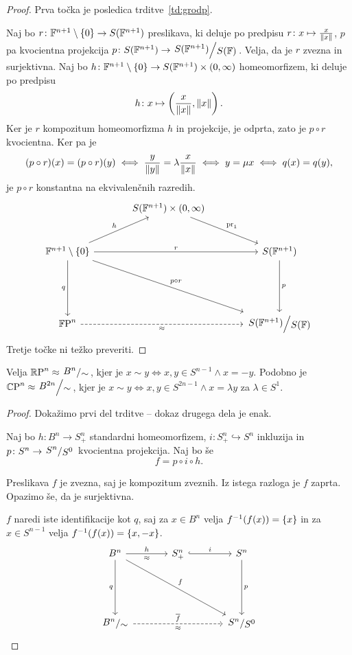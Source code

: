 
\begin{proof}
Prva točka je posledica trditve~\ref{td:grodp}.

Naj bo $r \colon \mathbb{F}^{n+1} \setminus \left\{0\right\} \to S(\mathbb{F}^{n+1})$
preslikava, ki deluje po predpisu
$r \colon x \mapsto \frac{x}{\left\lVert x\right\rVert}$, $p$ pa kvocientna
projekcija $p \colon S(\F^{n+1}) \to \kvoc{S(\F^{n+1})}{S(\F)}$.
Velja, da je $r$ zvezna in surjektivna. Naj bo
$h \colon \mathbb{F}^{n+1} \setminus \left\{0\right\} \to
S(\mathbb{F}^{n+1}) \times (0, \infty)$
homeomorfizem, ki deluje po predpisu
\[
h \colon x \mapsto \left(\frac{x}{\left\lVert x\right\rVert}, \left\lVert x\right\rVert\right).
\]
Ker je $r$ kompozitum homeomorfizma $h$ in projekcije,
je odprta, zato je $p \circ r$ kvocientna. Ker pa je
\[
(p \circ r)(x) = (p \circ r)(y) \iff
\frac{y}{\left\lVert y\right\rVert} = \lambda \frac{x}{\left\lVert x\right\rVert} \iff
y = \mu x \iff
q(x) = q(y),
\]
je $p \circ r$ konstantna na ekvivalenčnih razredih.
\[
\begin{tikzcd}[column sep=large, row sep=large]
& S(\F^{n+1}) \times (0, \infty)
  \arrow[dr, "\operatorname{pr}_1"]
&\\
\F^{n+1} \setminus \set{0}
\arrow[ur, "h"]
\arrow[rr, "r"]
\arrow[dd, "q"']
\arrow[ddrr, "p \circ r"]
&& S(\F^{n+1})
\arrow[dd, "p"] \\\\
\proj{\F}{n} \arrow[rr, dashrightarrow, "\approx"']
&& \kvoc{S(\F^{n+1})}{S(\F)}
\end{tikzcd}
\]
Tretje točke ni težko preveriti.
\end{proof}

\begin{trditev}
Velja $\proj{\R}{n} \approx \kvoc{B^n}{\sim}$, kjer je
$x \sim y \iff x, y \in S^{n-1} \land x = -y$. Podobno je
$\proj{\C}{n} \approx \kvoc{B^{2n}}{\sim}$, kjer je
$x \sim y \iff x, y \in S^{2n-1} \land x = \lambda y$ za
$\lambda \in S^1$.
\end{trditev}

\begin{proof}
Dokažimo prvi del trditve -- dokaz drugega dela je enak.

Naj bo $h \colon B^n \to S_+^n$ standardni homeomorfizem,
$i \colon S_+^n \hookrightarrow S^n$ inkluzija in
$p \colon S^n \to \kvoc{S^n}{S^0}$ kvocientna projekcija. Naj bo še
\[
f = p \circ i \circ h.
\]

Preslikava $f$ je zvezna, saj je kompozitum zveznih. Iz istega
razloga je $f$ zaprta. Opazimo še, da je surjektivna.

$f$ naredi iste identifikacije kot $q$, saj za $x \in B^n$
velja $f^{-1}(f(x)) = \left\{x\right\}$ in za $x \in S^{n-1}$ velja
$f^{-1}(f(x)) = \left\{x, -x\right\}$.
\[
\begin{tikzcd}[column sep=large, row sep=large]
B^n \arrow[r, "h", "\approx"'] \arrow[dd, "q"'] \arrow[ddrr, "f"] &
S_+^n \arrow[r, hook, "i"] &
S^n \arrow[dd, "p"] \\ \\
\kvoc{B^n}{\sim}
\arrow[rr, dashrightarrow, "\overline{f}", "\approx"'] &&
\kvoc{S^n}{S^0}
\end{tikzcd} \qedhere
\]
\end{proof}
